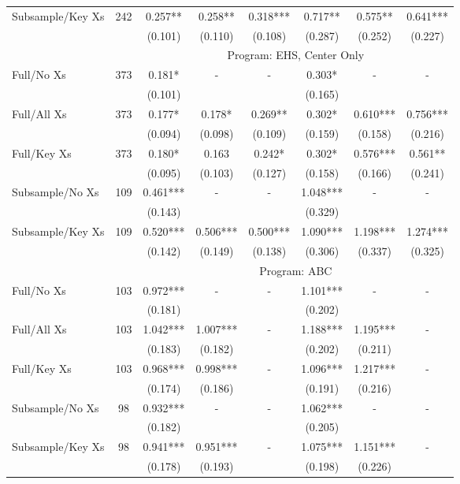 \begin{tabular}{lccccccc}
Subsample/Key Xs & 242 & 0.257** & 0.258** & 0.318*** & 0.717** & 0.575** & 0.641*** \\
 &  & (0.101) & (0.110) & (0.108) & (0.287) & (0.252) & (0.227) \\
\midrule 
 &  & \multicolumn{6}{c}{Program: EHS, Center Only} \\
 \cmidrule(lr){3-8} 
Full/No Xs & 373 & 0.181* & - & - & 0.303* & - & - \\
 &  & (0.101) &  &  & (0.165) &  &  \\
Full/All Xs & 373 & 0.177* & 0.178* & 0.269** & 0.302* & 0.610*** & 0.756*** \\
 &  & (0.094) & (0.098) & (0.109) & (0.159) & (0.158) & (0.216) \\
Full/Key Xs & 373 & 0.180* & 0.163 & 0.242* & 0.302* & 0.576*** & 0.561** \\
 &  & (0.095) & (0.103) & (0.127) & (0.158) & (0.166) & (0.241) \\
Subsample/No Xs & 109 & 0.461*** & - & - & 1.048*** & - & - \\
 &  & (0.143) &  &  & (0.329) &  &  \\
Subsample/Key Xs & 109 & 0.520*** & 0.506*** & 0.500*** & 1.090*** & 1.198*** & 1.274*** \\
 &  & (0.142) & (0.149) & (0.138) & (0.306) & (0.337) & (0.325) \\
\midrule 
 &  & \multicolumn{6}{c}{Program: ABC} \\
 \cmidrule(lr){3-8} 
Full/No Xs & 103 & 0.972*** & - & - & 1.101*** & - & - \\
 &  & (0.181) &  &  & (0.202) &  &  \\
Full/All Xs & 103 & 1.042*** & 1.007*** & - & 1.188*** & 1.195*** & - \\
 &  & (0.183) & (0.182) &  & (0.202) & (0.211) &  \\
Full/Key Xs & 103 & 0.968*** & 0.998*** & - & 1.096*** & 1.217*** & - \\
 &  & (0.174) & (0.186) &  & (0.191) & (0.216) &  \\
Subsample/No Xs & 98 & 0.932*** & - & - & 1.062*** & - & - \\
 &  & (0.182) &  &  & (0.205) &  &  \\
Subsample/Key Xs & 98 & 0.941*** & 0.951*** & - & 1.075*** & 1.151*** & - \\
 &  & (0.178) & (0.193) &  & (0.198) & (0.226) &  \\
\midrule 
\bottomrule 
\end{tabular}
